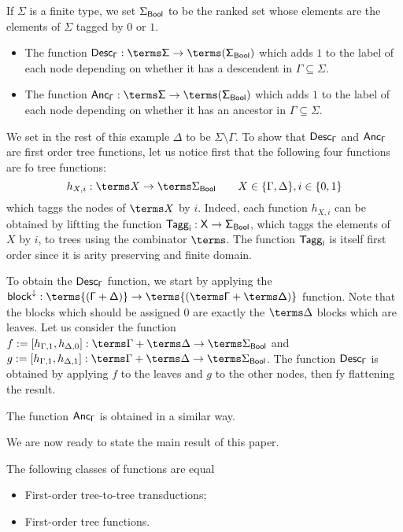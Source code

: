\bigskip
\noindent\begin{example}
If $\Sigma$ is a finite type, we set $\Sigma_{\sf{Bool}}$ to be the ranked set whose elements are the elements of $\Sigma$ tagged by $0$ or $1$. 
\begin{itemize}
\item The function $\sf{Desc}_\Gamma: \terms \Sigma \to \terms (\Sigma_{\sf{Bool}})$ which 
adds $1$ to the label of each node depending on whether it has a descendent in $\Gamma\subseteq \Sigma$.
\item The function $\sf{Anc}_\Gamma: \terms \Sigma \to \terms (\Sigma_{\sf{Bool}})$ which 
adds $1$ to the label of each node depending on whether it has an ancestor in $\Gamma\subseteq \Sigma$.
\end{itemize}

We set in the rest of this example $\Delta$ to be $\Sigma\setminus\Gamma$.
To show that $\sf{Desc}_\Gamma$ and $\sf{Anc}_\Gamma$ are first order tree functions, let us notice first that the following four functions are fo tree functions:
\[h_{X,i}:\terms X \to \terms \Sigma_{\sf{Bool}}\qquad X\in \{\Gamma,\Delta\}, i\in\{0,1\}\]
which taggs the nodes of $\terms X$ by $i$. 
Indeed, each function $h_{X,i}$ can be obtained by liftting the function $\sf{Tagg}_i:X\to\Sigma_{Bool}$, which taggs the elements of $X$ by $i$, to trees using the combinator $\terms$. The function $\sf{Tagg}_i$ is itself first order since it is arity preserving and finite domain.

To obtain the $\sf{Desc}_\Gamma$ function, we start by applying the $\sf{block}^{\downarrow}:\terms{(\Gamma+\Delta)}\to \terms{(\terms\Gamma+\terms\Delta)}$ function. Note that the blocks which should be assigned $0$ are exactly the $\terms \Delta$ blocks which are leaves. Let us consider the function $f:=[h_{\Gamma,1},h_{\Delta,0}]:\terms\Gamma+\terms \Delta\to \terms\Sigma_{\sf{Bool}}$ and $g:=[h_{\Gamma,1},h_{\Delta,1}]:\terms\Gamma+\terms \Delta\to \terms\Sigma_{\sf{Bool}}$. The function $\sf{Desc}_\Gamma$
is obtained by applying $f$ to the leaves and $g$ to the other nodes, then fy flattening the result.

\medskip
The function $\sf{Anc}_\Gamma$ is obtained in a similar way.    
\end{example}


We are now ready to state the main result of this paper. 
\begin{theorem}\label{thm:main}
    The following classes of functions are equal\begin{itemize}
        \item First-order tree-to-tree transductions;
        \item First-order tree functions.
    \end{itemize}
\end{theorem}

